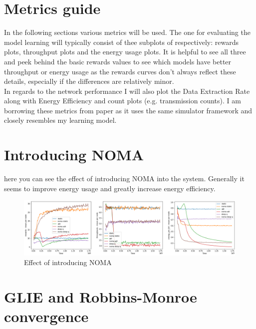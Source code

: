
\section{Metrics guide}
In the following sections various metrics will be used.
The one for evaluating the model learning will 
typically consist of thee subplots of respectively:
rewards plots, throughput plots and the energy usage plots. It is helpful to see all three and peek behind
the basic rewards values to see which models have 
better throughput or energy usage as the rewards curves
don't always reflect these details, especially if the 
differences are relatively minor. \\

In regards to the network performance I will also 
plot the Data Extraction Rate along with Energy Efficiency and count plots (e.g. transmission counts).
I am borrowing these metrics from paper \cite{rl_lora_original} as it uses the same simulator 
framework and closely resembles my learning model.

\section{Introducing NOMA}

here you can see the effect of introducing NOMA
into the system. Generally it seems to improve
energy usage and greatly increase energy efficiency.

\begin{figure}[H]
\centering
\hspace*{-2.3cm}  
\includegraphics[scale=0.40]{plots/NOMA/noma_small.png}
  \caption{Effect of introducing NOMA}
  \label{fig:tabular_q_decays}
\end{figure}

\section{GLIE and Robbins-Monroe convergence}

